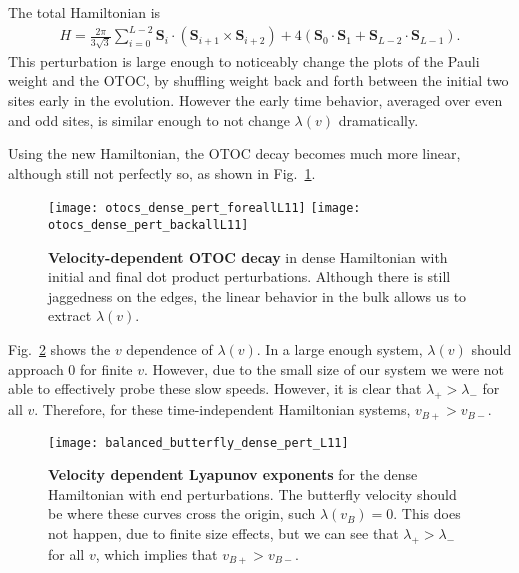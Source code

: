 The total Hamiltonian is
\begin{align}
H = \frac{2\pi}{3\sqrt{3}}\sum_{i=0}^{L-2}\bm{S}_i \cdot \left(\bm{S}_{i+1}
	\times\bm{S}_{i+2}\right) + 4\left(\bm{S}_0\cdot\bm{S}_1 + \bm{S}_{L-2}
	\cdot\bm{S}_{L-1}\right).
\end{align}
This perturbation is large enough to noticeably change the plots of the Pauli weight and the OTOC, by shuffling weight back and forth between the initial two sites early in the evolution. However the early time behavior, averaged over even and odd sites, is similar enough to not change $\lambda(v)$ dramatically.

Using the new Hamiltonian, the OTOC decay becomes much more linear, although still not perfectly so, as shown in Fig.~\ref{fig:otocs_pert}.
\begin{figure}
	\centering
	\texttt{[image: otocs\_dense\_pert\_foreallL11]}
	\texttt{[image: otocs\_dense\_pert\_backallL11]}
	\caption{\textbf{Velocity-dependent OTOC decay} in dense Hamiltonian with initial and final dot product perturbations. Although there is still jaggedness on the edges, the linear behavior in the bulk allows us to extract $\lambda(v)$.}
	\label{fig:otocs_pert}
\end{figure}
Fig.~\ref{fig:balanced_butterfly_dense_pert_L11} shows the $v$ dependence of $\lambda(v)$. In a large enough system, $\lambda(v)$ should approach 0 for finite $v$. However, due to the small size of our system we were not able to effectively probe these slow speeds. However, it is clear that $\lambda_+>\lambda_-$ for all $v$. Therefore, for these time-independent Hamiltonian systems, $v_{B+}>v_{B-}$.
\begin{figure}
	\centering
	\texttt{[image: balanced\_butterfly\_dense\_pert\_L11]}
	\caption{\textbf{Velocity dependent Lyapunov exponents} for the dense Hamiltonian with end perturbations. The butterfly velocity should be where these curves cross the origin, such $\lambda(v_B) = 0$. This does not happen, due to finite size effects, but we can see that $\lambda_+>\lambda_-$ for all $v$, which implies that $v_{B+}>v_{B-}$.}
	\label{fig:balanced_butterfly_dense_pert_L11}
\end{figure}